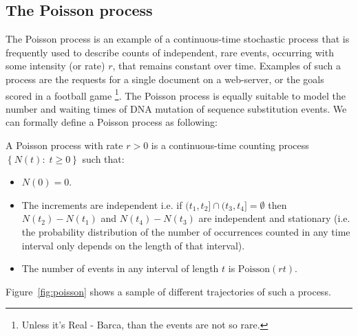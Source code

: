 \subsection{The Poisson process\label{sub:poisson}}

The Poisson process is an example of a continuous-time stochastic process that is frequently used to describe counts of independent, rare events, occurring with some intensity (or rate) $r$, that remains constant over time. 
Examples of such a process are the requests for a single document on a web-server, or the goals scored in a football game \footnote{Unless it's Real - Barca, than the events are not so rare.}.%
The Poisson process is equally suitable to model the number and waiting times of DNA mutation of sequence substitution events. 
We can formally define a Poisson process as following:

\begin{definition} 
A Poisson process with rate $r>0$ is a continuous-time counting process $\left\{ N(t):\; t\geq0\right\}$ such that:

\begin{itemize}
\item $N(0)=0$.
\item The increments are independent i.e. if $(t_{1},t_{2}]\cap(t_{3},t_{4}]=\emptyset$ then $N(t_2)-N(t_1)$ and $N(t_4)-N(t_3)$ are independent and stationary (i.e. the probability distribution of the number of occurrences counted in any time interval only depends on the length of that interval).
\item The number of events in any interval of length $t$ is $\text{Poisson}(r t)$.
\end{itemize}

Figure~\ref{fig:poisson} shows a sample of different trajectories of such a process.

\label{def:poisson}
\end{definition}




